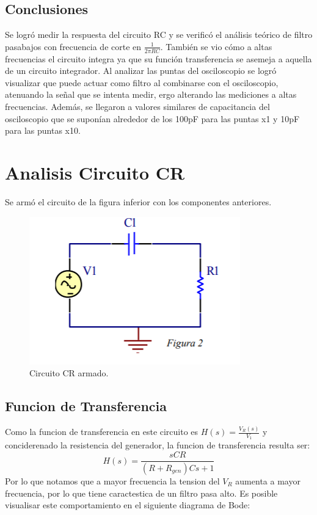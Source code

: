 \subsection{Conclusiones}

Se logró medir la respuesta del circuito RC  y se verificó el análisis teórico de filtro pasabajos con frecuencia de corte en $\frac{1}{2\pi RC}$. También se vio cómo a altas frecuencias el circuito integra ya que su función transferencia se asemeja a aquella de un circuito integrador.
Al analizar las puntas del osciloscopio se logró visualizar que puede actuar como filtro al combinarse con el osciloscopio, atenuando la señal que se intenta medir, ergo alterando las mediciones a altas frecuencias.
Además, se llegaron a valores similares de capacitancia del osciloscopio que se suponían alrededor de los 100pF para las puntas x1 y 10pF para las puntas x10.



\section{Analisis Circuito CR}

Se armó el circuito de la figura inferior con los componentes anteriores.

\begin{figure}[h!]
\centering
\includegraphics[scale=0.5]{crCircuito.png}
\caption{Circuito CR armado.}
\label{fig:CR}
\end{figure}


\subsection{Funcion de Transferencia}

Como la funcion de transferencia en este circuito es $H(s) = \frac{V_R(s)}{V_1}$ y conciderenado la resistencia del generador, la funcion de transferencia resulta ser:
$$H(s) = \frac{sCR}{\left(R+R_{gen}\right)Cs+1}$$
Por lo que notamos que a mayor frecuencia la tension del $V_R$ aumenta a mayor frecuencia, por lo que tiene caractestica de un filtro pasa alto. Es posible visualisar este comportamiento en el siguiente diagrama de Bode:


